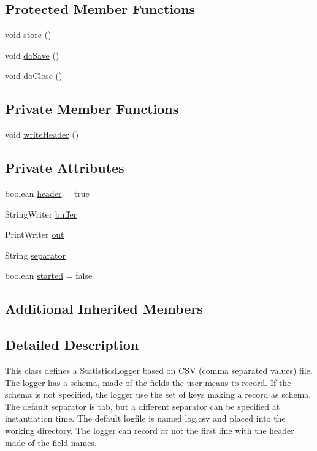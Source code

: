 \subsection*{Protected Member Functions}
\begin{DoxyCompactItemize}
\item 
void \hyperlink{classjenes_1_1utils_1_1_c_s_v_logger_a863bcfda3e93b023949a81e7f6d149e7}{store} ()
\item 
void \hyperlink{classjenes_1_1utils_1_1_c_s_v_logger_a09a4f4fc362db6d4090d75642521ee65}{do\-Save} ()
\item 
void \hyperlink{classjenes_1_1utils_1_1_c_s_v_logger_ac89f6fe5bd609fcc02ca7adf1407f279}{do\-Close} ()
\end{DoxyCompactItemize}
\subsection*{Private Member Functions}
\begin{DoxyCompactItemize}
\item 
void \hyperlink{classjenes_1_1utils_1_1_c_s_v_logger_afa1083ea9d3cb8141eeb8b4edccd358e}{write\-Header} ()
\end{DoxyCompactItemize}
\subsection*{Private Attributes}
\begin{DoxyCompactItemize}
\item 
boolean \hyperlink{classjenes_1_1utils_1_1_c_s_v_logger_a37a4fd771c2013343778dd982244c2db}{header} = true
\item 
String\-Writer \hyperlink{classjenes_1_1utils_1_1_c_s_v_logger_a7b4d74ee20080fcfb995fbf9eb747c1f}{buffer}
\item 
Print\-Writer \hyperlink{classjenes_1_1utils_1_1_c_s_v_logger_ad13ae42760c41f1899e66981e0cc0274}{out}
\item 
String \hyperlink{classjenes_1_1utils_1_1_c_s_v_logger_ab776f8518f5adaad782861e258ca494a}{separator}
\item 
boolean \hyperlink{classjenes_1_1utils_1_1_c_s_v_logger_a7ddf63656836e437a692c15feb38ef8f}{started} = false
\end{DoxyCompactItemize}
\subsection*{Additional Inherited Members}


\subsection{Detailed Description}
This class defines a Statistics\-Logger based on C\-S\-V (comma separated values) file. The logger has a schema, made of the fields the user means to record. If the schema is not specified, the logger use the set of keys making a record as schema. The default separator is tab, but a different separator can be specified at instantiation time. The default logfile is named log.\-csv and placed into the working directory. The logger can record or not the first line with the header made of the field names.

